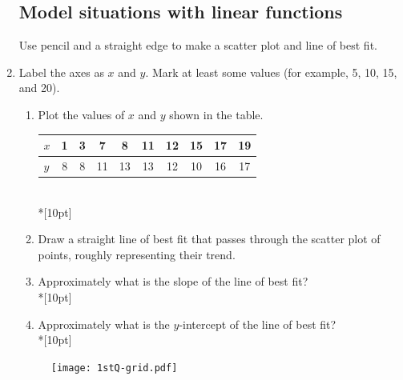 \documentclass[]{book}
\begin{document}
\begin{enumerate}
\begin{enumerate}
\end{enumerate}

\newpage
\subsection*{Model situations with linear functions}
Use pencil and a straight edge to make a scatter plot and line of best fit.
\item Label the axes as  $x$ and $y$. Mark at least some values (for example, 5, 10, 15, and 20). 
\begin{enumerate}
    \item Plot the values of $x$ and $y$ shown in the table.\\[5pt]
	\begin{tabular}{|l|c|c|c|c|c|c|c|c|c|}
	\hline
	$x$ & 1 & 3 & 7 & 8 & 11 & 12 & 15 & 17 & 19\\
	\hline
    $y$ & 8 & 8 & 11 & 13 & 13 & 12 & 10 & 16 & 17\\
	\hline
	\end{tabular}\\*[10pt]
	\item Draw a straight line of best fit that passes through the scatter plot of points, roughly representing their trend.
	\item Approximately what is the slope of the line of best fit?\\*[10pt]
	\item Approximately what is the $y$-intercept of the line of best fit?\\*[10pt]
\end{enumerate}

\begin{figure}[!ht]
    \centering
    \texttt{[image: 1stQ-grid.pdf]}
\end{figure}

\end{enumerate}
\end{document}
